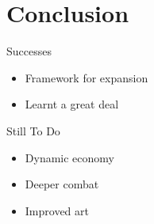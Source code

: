 \section{Conclusion}
\begin{frame}{Successes}
  \begin{itemize}
    \item Framework for expansion
    \item Learnt a great deal
  \end{itemize}
\end{frame}

\begin{frame}{Still To Do}
  \begin{itemize}
    \item Dynamic economy
    \item Deeper combat
    \item Improved art
  \end{itemize}
\end{frame}




